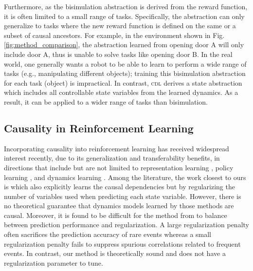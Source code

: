 Furthermore, as the bisimulation abstraction is derived from the reward function, it is often limited to a small range of tasks. Specifically, the abstraction can only generalize to tasks where the new reward function is defined on the same or a subset of causal ancestors. 
For example, in the environment shown in Fig. \ref{fig:method_comparison}, the abstraction learned from opening door A will only include door A, thus is unable to solve tasks like opening door B.
In the real world, one generally wants a robot to be able to learn to perform a wide range of tasks (e.g., manipulating different objects); training this bisimulation abstraction for each task (object) is impractical. In contrast, \textsc{cdl} derives a state abstraction which includes all controllable state variables from the learned dynamics. As a result, it can be applied to a wider range of tasks than bisimulation.

\subsection{Causality in Reinforcement Learning}
\label{subsec:reglarization_based_learning}

Incorporating causality into reinforcement learning has received widespread interest recently, due to its generalization and transferability benefits, in directions that include but are not limited to representation learning \cite{zhang2019learning, zhang2020invariant, sontakke2021causal, volodin2020resolving, tomar2021model, fu2021learning}, policy learning \cite{buesing2018woulda, nair2019causal, mozifian2020intervention, lyle2021resolving, seitzer2021causal, lu2020sample}, and dynamics learning \cite{li2020causal}. Among the literature, the work closest to ours is \citet{wang2021task} which also explicitly learns the causal dependencies but by regularizing the number of variables used when predicting each state variable. However, there is no theoretical guarantee that dynamics models learned by those methods are causal. Moreover, it is found to be difficult for the method from \citet{wang2021task} to balance between prediction performance and regularization. A large regularization penalty often sacrifices the prediction accuracy of rare events whereas a small regularization penalty fails to suppress spurious correlations related to frequent events. In contrast, our method is theoretically sound and does not have a regularization parameter to tune.